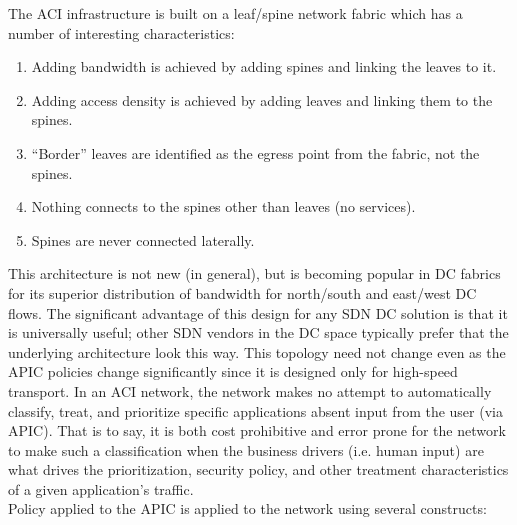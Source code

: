 The ACI infrastructure is built on a leaf/spine network fabric which has a
number of interesting characteristics:

\begin{enumerate}
  \item Adding bandwidth is achieved by adding spines and linking the leaves to it.
  \item Adding access density is achieved by adding leaves and linking them to
  the spines.
  \item ``Border'' leaves are identified as the egress point from the fabric,
  not the spines.
  \item Nothing connects to the spines other than leaves (no services).
  \item Spines are never connected laterally.
\end{enumerate}

This architecture is not new (in general), but is becoming popular in DC
fabrics for its superior distribution of bandwidth for north/south and
east/west DC flows. The significant advantage of this design for any SDN DC
solution is that it is universally useful; other SDN vendors in the DC space
typically prefer that the underlying architecture look this way. This topology
need not change even as the APIC policies change significantly since it is
designed only for high-speed transport. In an ACI network, the network makes
no attempt to automatically classify, treat, and prioritize specific
applications absent input from the user (via APIC). That is to say, it is both
cost prohibitive and error prone for the network to make such a classification
when the business drivers (i.e. human input) are what drives the
prioritization, security policy, and other treatment characteristics of a
given application's traffic. \\

Policy applied to the APIC is applied to the network using several constructs:

